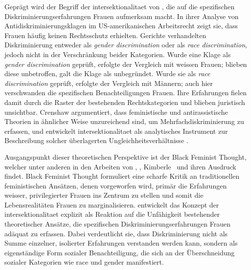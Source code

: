 Geprägt wird der Begriff der \gls{intersektionalitaet} von \textcite{crenshawMappingMarginsIntersectionality1991}, die auf die spezifischen Diskriminierungserfahrungen \emph{}\footnotemark Frauen aufmerksam macht. In ihrer Analyse von Antidiskriminierungsklagen im US-amerikanischen Arbeitsrecht zeigt sie, dass \emph{} Frauen häufig keinen Rechtsschutz erhielten. Gerichte verhandelten Diskriminierung entweder als \emph{\gls{gender} discrimination} oder als \emph{\gls{race} discrimination}, jedoch nicht in der Verschränkung beider Kategorien. Wurde eine Klage als \emph{\gls{gender} discrimination} geprüft, erfolgte der Vergleich mit weissen Frauen; blieben diese unbetroffen, galt die Klage als unbegründet. Wurde sie als \emph{\gls{race} discrimination} geprüft, erfolgte der Vergleich mit \emph{} Männern; auch hier verschwanden die spezifischen Benachteiligungen \emph{} Frauen. Ihre Erfahrungen fielen damit durch die Raster der bestehenden Rechtskategorien und blieben juristisch unsichtbar. Crenshaw argumentiert, dass feministische und antirassistische Theorien in ähnlicher Weise unzureichend sind, um Mehrfachdiskriminierung zu erfassen, und entwickelt \gls{intersektionalitaet} als analytisches Instrument zur Beschreibung solcher überlagerten Ungleichheitsverhältnisse \parencite[\gls{vgl}][]{hancockWhenMultiplicationDoesnt2007}.


Ausgangspunkt dieser theoretischen Perspektive ist der Black Feminist Thought, welcher unter anderen in den Arbeiten von \textcite{hooksAintWomanBlack1981}, \textcite{lordeSisterOutsiderEssays1984}, Kimberle~\textcite{crenshawMappingMarginsIntersectionality1991} und \textcite{collinsBlackFeministThought2002} ihren Ausdruck findet. Black Feminist Thought formuliert eine scharfe Kritik an traditionellen feministischen Ansätzen, denen vorgeworfen wird, primär die Erfahrungen weisser, privilegierter Frauen ins Zentrum zu stellen und somit die Lebensrealitäten \emph{} Frauen zu marginalisieren. \textcite{crenshawMappingMarginsIntersectionality1991} entwickelt das Konzept der \gls{intersektionalitaet} explizit als Reaktion auf die Unfähigkeit bestehender theoretischer Ansätze, die spezifischen Diskriminierungserfahrungen \emph{} Frauen adäquat zu erfassen. Dabei verdeutlicht sie, dass Diskriminierung nicht als Summe einzelner, isolierter Erfahrungen verstanden werden kann, sondern als eigenständige Form sozialer Benachteiligung, die sich an der Überschneidung sozialer Kategorien wie \gls{race} und \gls{gender} manifestiert.

